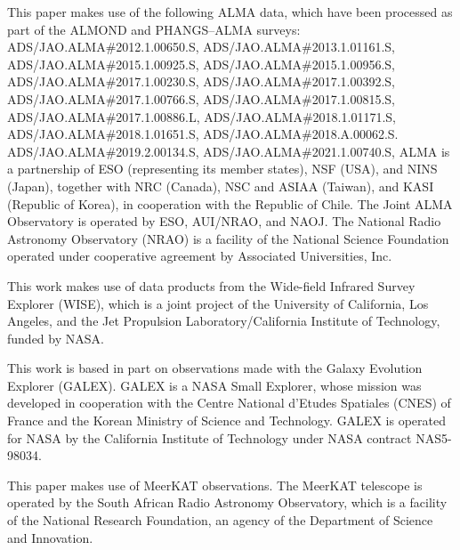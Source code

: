 \documentclass[letter, longauth]{aa} %
\begin{document}
\begin{acknowledgements}
This paper makes use of the following ALMA data, which have been processed as part of the ALMOND and PHANGS--ALMA surveys: \\
\noindent ADS/JAO.ALMA\#2012.1.00650.S, \linebreak %
ADS/JAO.ALMA\#2013.1.01161.S, \linebreak %
ADS/JAO.ALMA\#2015.1.00925.S, \linebreak %
ADS/JAO.ALMA\#2015.1.00956.S, \linebreak %
ADS/JAO.ALMA\#2017.1.00230.S, \linebreak %
ADS/JAO.ALMA\#2017.1.00392.S, \linebreak %
ADS/JAO.ALMA\#2017.1.00766.S, \linebreak %
ADS/JAO.ALMA\#2017.1.00815.S, \linebreak %
ADS/JAO.ALMA\#2017.1.00886.L, \linebreak %
ADS/JAO.ALMA\#2018.1.01171.S, \linebreak %
ADS/JAO.ALMA\#2018.1.01651.S, \linebreak %
ADS/JAO.ALMA\#2018.A.00062.S. \linebreak %
ADS/JAO.ALMA\#2019.2.00134.S, \linebreak %
ADS/JAO.ALMA\#2021.1.00740.S, \linebreak %
ALMA is a partnership of ESO (representing its member states), NSF (USA), and NINS (Japan), together with NRC (Canada), NSC and ASIAA (Taiwan), and KASI (Republic of Korea), in cooperation with the Republic of Chile. The Joint ALMA Observatory is operated by ESO, AUI/NRAO, and NAOJ. The National Radio Astronomy Observatory (NRAO) is a facility of the National Science Foundation operated under cooperative agreement by Associated Universities, Inc.

This work makes use of data products from the Wide-field Infrared Survey Explorer (WISE), which is a joint project of the University of California, Los Angeles, and the Jet Propulsion Laboratory/California Institute of Technology, funded by NASA.

This work is based in part on observations made with the Galaxy Evolution Explorer (GALEX). GALEX is a NASA Small Explorer, whose mission was developed in cooperation with the Centre National d'Etudes Spatiales (CNES) of France and the Korean Ministry of Science and Technology. GALEX is operated for NASA by the California Institute of Technology under NASA contract NAS5-98034.

This paper makes use of MeerKAT observations. The MeerKAT telescope is operated by the South African Radio Astronomy Observatory, which is a facility of the National Research Foundation, an agency of the Department of Science and Innovation.

\end{acknowledgements}
\end{document}
